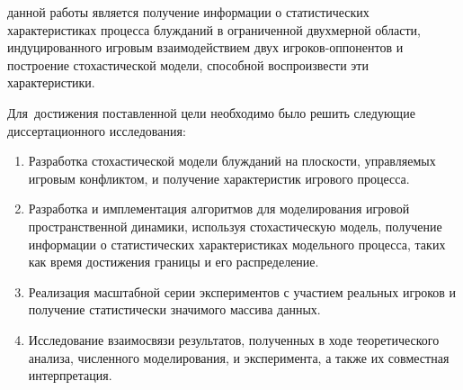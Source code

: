 
{\aim} данной работы является получение информации о статистических
характеристиках процесса блужданий в ограниченной двухмерной области, индуцированного игровым
взаимодействием двух игроков-оппонентов и построение стохастической модели, способной воспроизвести эти характеристики. 

Для~достижения поставленной цели необходимо было решить следующие {\tasks} диссертационного исследования:
\begin{enumerate}[beginpenalty=10000] %
    \item Разработка стохастической модели блужданий на плоскости, управляемых
    игровым конфликтом, и получение характеристик игрового процесса.
    \item Разработка и имплементация алгоритмов для моделирования
    игровой пространственной динамики, используя стохастическую
    модель, получение информации о статистических характеристиках
    модельного процесса, таких как время достижения границы и его
    распределение.
    \item Реализация масштабной серии экспериментов с участием
    реальных игроков и получение статистически значимого массива
    данных.
    \item Исследование взаимосвязи результатов, полученных в ходе
    теоретического анализа, численного моделирования, и эксперимента, а
    также их совместная интерпретация.
\end{enumerate}


